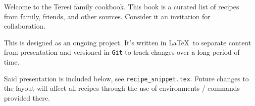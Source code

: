 Welcome to the Teresi family cookbook.
This book is a curated list of recipes from family, friends, and other sources.
Consider it an invitation for collaboration.

This is designed as an ongoing project.
It's written in \LaTeX\ to separate content from presentation and versioned in \texttt{Git} to track changes over a long period of time.

Said presentation is included below, see \texttt{recipe\_snippet.tex}.
Future changes to the layout will affect all recipes through the use of environments / commands provided there.

